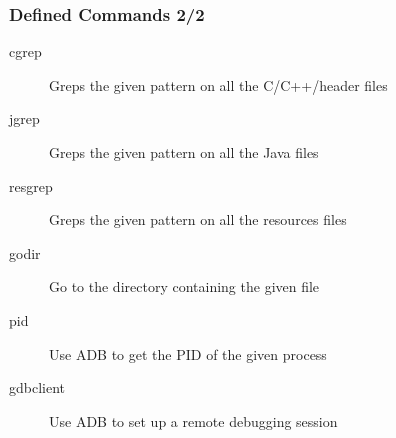 \begin{frame}    
  \frametitle{Defined Commands 2/2}
  \begin{description}
  \item[cgrep] Greps the given pattern on all the C/C++/header files
  \item[jgrep] Greps the given pattern on all the Java files
  \item[resgrep] Greps the given pattern on all the resources files 
  \item[godir] Go to the directory containing the given file
  \item[pid] Use ADB to get the PID of the given process
  \item[gdbclient] Use ADB to set up a remote debugging session
  \end{description}
\end{frame}
